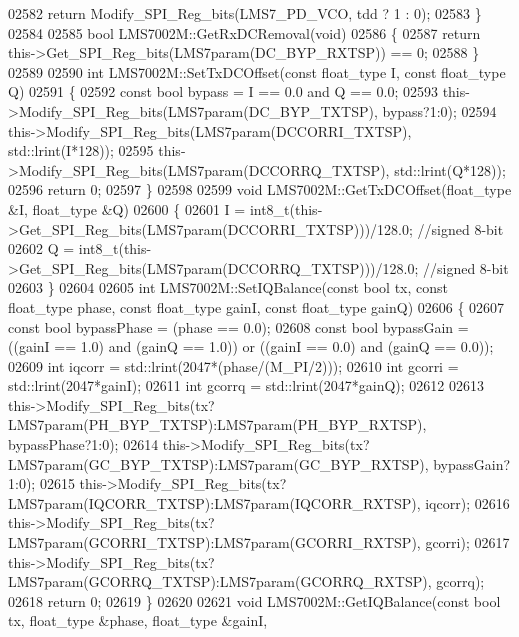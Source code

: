 \begin{DoxyCode}
{{{{{{{{{{{{{{{{{{{{{{{{{{{{{{{{{{{{{{{{{{{{{{{{{{{{{{{{{{{{{{{{02582     \textcolor{keywordflow}{return} Modify_SPI_Reg_bits(LMS7_PD_VCO, tdd ? 1 : 0);
02583 \}
02584 
02585 \textcolor{keywordtype}{bool} LMS7002M::GetRxDCRemoval(\textcolor{keywordtype}{void})
02586 \{
02587     \textcolor{keywordflow}{return} this->Get_SPI_Reg_bits(LMS7param(DC_BYP_RXTSP)) == 0;
02588 \}
02589 
02590 \textcolor{keywordtype}{int} LMS7002M::SetTxDCOffset(\textcolor{keyword}{const} float_type I, \textcolor{keyword}{const} float_type Q)
02591 \{
02592     \textcolor{keyword}{const} \textcolor{keywordtype}{bool} bypass = I == 0.0 and Q == 0.0;
02593     this->Modify_SPI_Reg_bits(LMS7param(DC_BYP_TXTSP), bypass?1:0);
02594     this->Modify_SPI_Reg_bits(LMS7param(DCCORRI_TXTSP), std::lrint(I*128));
02595     this->Modify_SPI_Reg_bits(LMS7param(DCCORRQ_TXTSP), std::lrint(Q*128));
02596     \textcolor{keywordflow}{return} 0;
02597 \}
02598 
02599 \textcolor{keywordtype}{void} LMS7002M::GetTxDCOffset(float_type &I, float_type &Q)
02600 \{
02601     I = int8\_t(this->Get_SPI_Reg_bits(LMS7param(DCCORRI_TXTSP)))/128.0; \textcolor{comment}{//signed 8-bit}
02602     Q = int8\_t(this->Get_SPI_Reg_bits(LMS7param(DCCORRQ_TXTSP)))/128.0; \textcolor{comment}{//signed 8-bit}
02603 \}
02604 
02605 \textcolor{keywordtype}{int} LMS7002M::SetIQBalance(\textcolor{keyword}{const} \textcolor{keywordtype}{bool} tx, \textcolor{keyword}{const} float_type phase, \textcolor{keyword}{const} 
      float_type gainI, \textcolor{keyword}{const} float_type gainQ)
02606 \{
02607     \textcolor{keyword}{const} \textcolor{keywordtype}{bool} bypassPhase = (phase == 0.0);
02608     \textcolor{keyword}{const} \textcolor{keywordtype}{bool} bypassGain = ((gainI == 1.0) and (gainQ == 1.0)) or ((gainI == 0.0) and (gainQ == 0.0));
02609     \textcolor{keywordtype}{int} iqcorr = std::lrint(2047*(phase/(M\_PI/2)));
02610     \textcolor{keywordtype}{int} gcorri = std::lrint(2047*gainI);
02611     \textcolor{keywordtype}{int} gcorrq = std::lrint(2047*gainQ);
02612 
02613     this->Modify_SPI_Reg_bits(tx?LMS7param(PH_BYP_TXTSP):LMS7param(PH_BYP_RXTSP), bypassPhase?1:0);
02614     this->Modify_SPI_Reg_bits(tx?LMS7param(GC_BYP_TXTSP):LMS7param(GC_BYP_RXTSP), bypassGain?1:0);
02615     this->Modify_SPI_Reg_bits(tx?LMS7param(IQCORR_TXTSP):LMS7param(IQCORR_RXTSP), iqcorr);
02616     this->Modify_SPI_Reg_bits(tx?LMS7param(GCORRI_TXTSP):LMS7param(GCORRI_RXTSP), gcorri);
02617     this->Modify_SPI_Reg_bits(tx?LMS7param(GCORRQ_TXTSP):LMS7param(GCORRQ_RXTSP), gcorrq);
02618     \textcolor{keywordflow}{return} 0;
02619 \}
02620 
02621 \textcolor{keywordtype}{void} LMS7002M::GetIQBalance(\textcolor{keyword}{const} \textcolor{keywordtype}{bool} tx, float_type &phase, float_type &gainI, 
}}}}}}}}}}}}}}}}}}}}}}}}}}}}}}}}}}}}}}}}}}}}}}}}}}}}}}}}}}}}}}}}
\end{DoxyCode}

